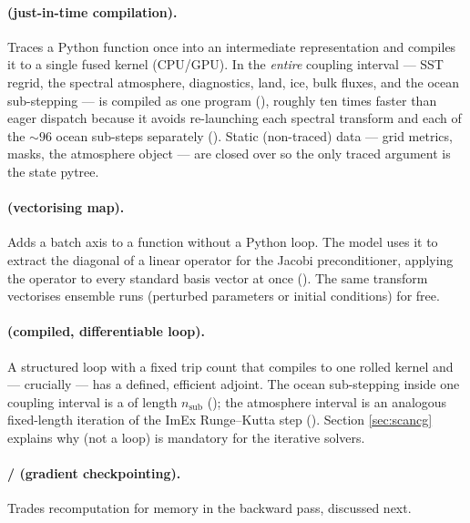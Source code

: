 \paragraph{ (just-in-time compilation).} Traces a Python function once into an
intermediate representation and compiles it to a single fused kernel (CPU/GPU). In \model{} the
\emph{entire} coupling interval --- SST regrid, the spectral atmosphere, diagnostics, land, ice,
bulk fluxes, and the ocean sub-stepping --- is compiled as one program (),
roughly ten times faster than eager dispatch because it avoids re-launching each spectral
transform and each of the $\sim96$ ocean sub-steps separately
(). Static (non-traced) data ---
grid metrics, masks, the atmosphere object --- are closed over so the only traced argument is the
state pytree.

\paragraph{ (vectorising map).} Adds a batch axis to a function without a Python loop.
The model uses it to extract the diagonal of a linear operator for the Jacobi preconditioner,
applying the operator to every standard basis vector at once
(). The same
transform vectorises ensemble runs (perturbed parameters or initial conditions) for free.

\paragraph{ (compiled, differentiable loop).} A structured loop with a fixed trip
count that compiles to one rolled kernel and --- crucially --- has a defined, efficient adjoint.
The ocean sub-stepping inside one coupling interval is a  of length $n_{\mathrm{sub}}$
(); the atmosphere interval is
an analogous fixed-length iteration of the ImEx Runge--Kutta step
(). Section
\ref{sec:scancg} explains why  (not a  loop) is mandatory for the iterative
solvers.

\paragraph{/ (gradient checkpointing).} Trades recomputation for
memory in the backward pass, discussed next.

